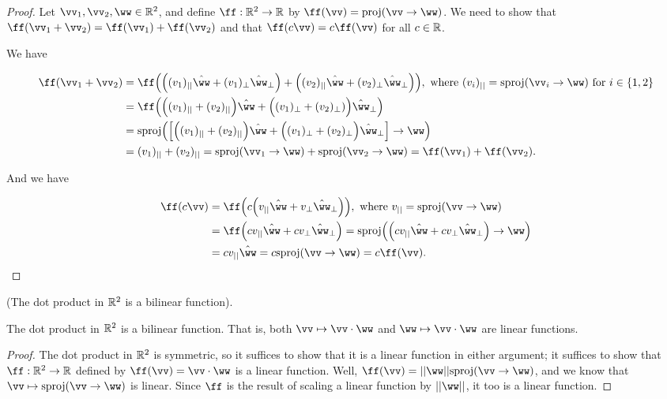\begin{proof}
    Let $\vv_1, \vv_2, \ww \in \R^2$, and define $\ff:\R^2 \rightarrow \R$ by $\ff(\vv) = \proj(\vv \rightarrow \ww)$. We need to show that $\ff(\vv_1 + \vv_2) = \ff(\vv_1) + \ff(\vv_2)$ and that $\ff(c\vv) = c\ff(\vv)$ for all $c \in \mathbb{R}$. 
    
    We have
    
    \begin{align*}
        \ff(\vv_1 + \vv_2) &= \ff\Big(\Big((v_1)_{||}\hat{\ww} + (v_1)_{\perp}\hat{\ww}_\perp \Big) + \Big((v_2)_{||}\hat{\ww} + (v_2)_\perp \hat{\ww}_\perp \Big) \Big), \text{ where $(v_i)_{||} = \sproj(\vv_i \rightarrow \ww)$ for $i \in \{1, 2\}$} \\
        &= \ff \Big(\Big((v_1)_{||} + (v_2)_{||} \Big) \hat{\ww} + \Big((v_1)_\perp + (v_2)_\perp) \Big) \hat{\ww}_\perp \Big) \\
        &= \sproj\Big(\Big[ \Big((v_1)_{||} + (v_2)_{||} \Big) \hat{\ww} + \Big((v_1)_\perp + (v_2)_\perp \Big) \hat{\ww}_\perp \Big] \rightarrow \ww \Big) \\
        &= (v_1)_{||} + (v_2)_{||} 
        = \sproj(\vv_1 \rightarrow \ww) + \sproj(\vv_2 \rightarrow \ww) = \ff(\vv_1) + \ff(\vv_2).
    \end{align*}

    And we have
    
    \begin{align*}
        \ff(c \vv) &= 
        \ff \Big(c \Big(v_{||}\hat{\ww} + v_{\perp}\hat{\ww}_\perp \Big) \Big), \text{ where $v_{||} = \sproj(\vv \rightarrow \ww)$} \\
        &= \ff\Big(cv_{||}\hat{\ww} + cv_{\perp}\hat{\ww}_\perp \Big)
        = \sproj\Big(\Big(cv_{||}\hat{\ww} + cv_{\perp}\hat{\ww}_\perp \Big) \rightarrow \ww \Big) \\
        &= c v_{||} \hat{\ww} = c \sproj(\vv \rightarrow \ww) = c \ff(\vv).
    \end{align*}
\end{proof}

\begin{theorem}
\label{ch::lin_alg::thm::geom_dot_product_bilinear}
    (The dot product in $\mathbb{R}^2$ is a bilinear function).
    
    The dot product in $\mathbb{R}^2$ is a bilinear function. That is, both $\vv \mapsto \vv \cdot \ww$ and $\ww \mapsto \vv \cdot \ww$ are linear functions.
\end{theorem}

\begin{proof}
    The dot product in $\mathbb{R}^2$ is symmetric, so it suffices to show that it is a linear function in either argument; it suffices to show that $\ff:\R^2 \rightarrow \R$ defined by $\ff(\vv) = \vv \cdot \ww$ is a linear function. Well, ${\ff(\vv) = ||\ww||\sproj(\vv \rightarrow \ww)}$, and we know that $\vv \mapsto \sproj(\vv \rightarrow \ww)$ is linear. Since $\ff$ is the result of scaling a linear function by $||\ww||$, it too is a linear function.
\end{proof}

